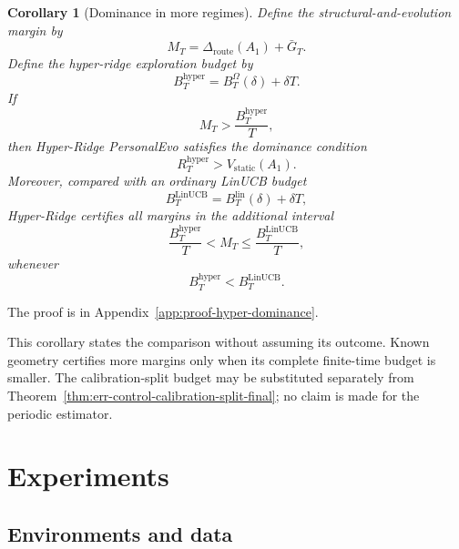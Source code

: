 \documentclass{article} %
\newtheorem{corollary}[theorem]{Corollary}
\begin{document}
\begin{corollary}[Dominance in more regimes]
\label{cor:hyper-dominance}
Define the structural-and-evolution margin by
\begin{equation}
\label{eq:hyper-margin}
M_T
=
\Delta_{\mathrm{route}}(A_1)+\bar G_T.
\end{equation}
Define the hyper-ridge exploration budget by
\begin{equation}
\label{eq:hyper-budget}
B_T^{\mathrm{hyper}}
=
B_T^\Omega(\delta)+\delta T.
\end{equation}
If
\begin{equation}
\label{eq:hyper-dom-condition}
M_T
>
\frac{B_T^{\mathrm{hyper}}}{T},
\end{equation}
then Hyper-Ridge PersonalEvo satisfies the dominance condition
\begin{equation}
\label{eq:hyper-dom-reward}
R_T^{\mathrm{hyper}}
>
V_{\mathrm{static}}(A_1).
\end{equation}
Moreover, compared with an ordinary LinUCB budget
\begin{equation}
\label{eq:hyper-linucb-budget}
B_T^{\mathrm{LinUCB}}
=
B_T^{\mathrm{lin}}(\delta)+\delta T,
\end{equation}
Hyper-Ridge certifies all margins in the additional interval
\begin{equation}
\label{eq:hyper-new-regime}
\frac{B_T^{\mathrm{hyper}}}{T}
<
M_T
\le
\frac{B_T^{\mathrm{LinUCB}}}{T},
\end{equation}
whenever
\begin{equation}
\label{eq:hyper-budget-order}
B_T^{\mathrm{hyper}}
<
B_T^{\mathrm{LinUCB}}.
\end{equation}
\end{corollary}

The proof is in Appendix~\ref{app:proof-hyper-dominance}.

This corollary states the comparison without assuming its outcome. Known geometry certifies more margins only when its complete finite-time budget is smaller. The calibration-split budget may be substituted separately from Theorem~\ref{thm:err-control-calibration-split-final}; no claim is made for the periodic estimator.

\section{Experiments}

\label{sec:experiments}

\subsection{Environments and data}
\end{document}
